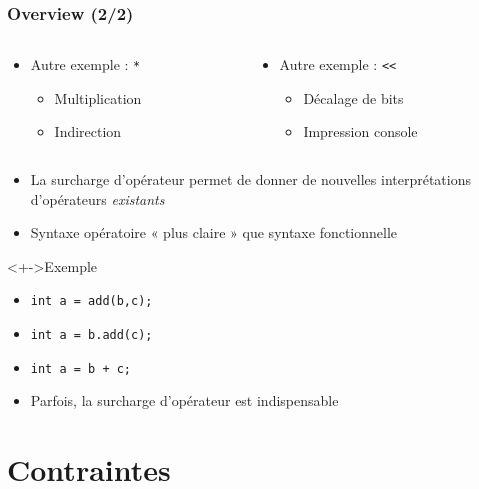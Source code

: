 \begin{frame}
\frametitle{Overview (2/2)}
\begin{columns}
	\begin{column}{.45\textwidth}
	\begin{itemize}[<+->]
	\item Autre exemple : \texttt{*}
		\begin{itemize}
		\item Multiplication
		\item Indirection
		\end{itemize}
	\end{itemize}
	\end{column}
	\begin{column}{.45\textwidth}
		\begin{itemize}[<+->]
		\item Autre exemple : \texttt{<<}
			\begin{itemize}
			\item Décalage de bits
			\item Impression console
			\end{itemize}
		\end{itemize}
		\end{column}
\end{columns}
\begin{itemize}[<+->]
\item La surcharge d'opérateur permet de donner de nouvelles interprétations d'opérateurs \emph{existants}
\item Syntaxe opératoire « plus claire » que syntaxe fonctionnelle
\end{itemize}
\begin{exampleblock}<+->{Exemple}
	\begin{itemize}[<+->]
	\item \lstinline|int a = add(b,c);|
	\item \lstinline|int a = b.add(c);|
	\item \lstinline|int a = b + c;|
	\end{itemize}
\end{exampleblock}
\begin{itemize}[<+->]
\item Parfois, la surcharge d'opérateur est indispensable
\end{itemize}
\end{frame}

\section{Contraintes}

